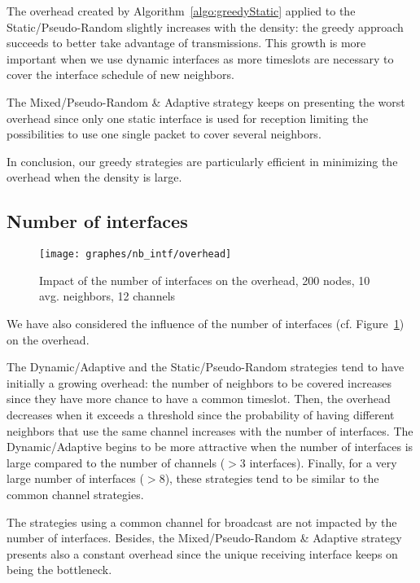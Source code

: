\documentclass[twoside]{article}
\begin{document}
The overhead created by Algorithm~\ref{algo:greedyStatic} applied to the
Static/Pseudo-Random slightly increases with the density: the greedy approach
succeeds to better take advantage of transmissions.
This growth is more important when we use dynamic interfaces as more timeslots are necessary to cover the interface schedule of new neighbors.


The Mixed/Pseudo-Random \& Adaptive strategy keeps on presenting the worst overhead since only one static interface is used for reception limiting the possibilities to use one single packet to cover several neighbors.



In conclusion, our greedy strategies are particularly efficient in minimizing the overhead when the density is large.




\subsection{Number of interfaces}
\begin{figure}
\begin{center}
	\texttt{[image: graphes/nb\_intf/overhead]}
	\caption{Impact of the number of interfaces on the overhead, 200 nodes, 10 avg. neighbors, 12 channels}
	\label{fig:nbint_overhead}
\end{center}
\end{figure}

We have also considered the influence of the number of interfaces (cf. Figure~\ref{fig:nbint_overhead}) on the overhead. 

The Dynamic/Adaptive and the Static/Pseudo-Random  strategies tend to have initially a growing overhead: the number of neighbors to be covered increases since they have more chance to have a common timeslot.
Then, the overhead decreases when it exceeds a threshold since the probability of having different neighbors that use the same channel increases with the number of interfaces.
The Dynamic/Adaptive begins to be more attractive when the number of interfaces is large compared to the number of channels ($> 3$ interfaces).
Finally, for a very large number of interfaces ($>8$), these strategies tend to be similar to the common channel strategies. 

The strategies using a common channel for broadcast are not impacted by the number of interfaces. 
Besides, the Mixed/Pseudo-Random \& Adaptive strategy presents also a constant overhead since the unique receiving interface keeps on being the bottleneck. 
\end{document}
